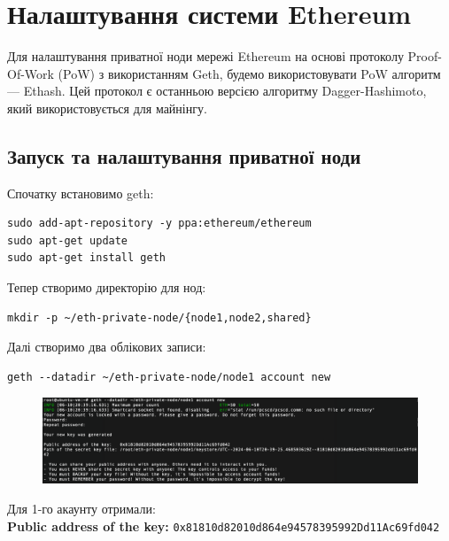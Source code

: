 
\chapter{Налаштування системи Ethereum}
\label{chap:review}  %

Для налаштування приватної ноди мережі Ethereum на основі протоколу Proof-Of-Work (PoW) з використанням Geth, будемо використовувати PoW алгоритм --- Ethash. Цей протокол є останньою версією алгоритму Dagger-Hashimoto, який використовується для майнінгу.

\section{Запуск та налаштування приватної ноди}

Спочатку встановимо geth:
\begin{verbatim}
sudo add-apt-repository -y ppa:ethereum/ethereum
sudo apt-get update
sudo apt-get install geth
\end{verbatim}

Тепер створимо директорію для нод:
\begin{verbatim}
mkdir -p ~/eth-private-node/{node1,node2,shared}
\end{verbatim}

Далі створимо два облікових записи:
\begin{verbatim}
geth --datadir ~/eth-private-node/node1 account new
\end{verbatim}

\vspace{-0.5cm}

\begin{figure}[ht]
        \centering
        \includegraphics[scale=0.35]{IMAGES/newAcc1.png}
        \label{fig_pacman}
\end{figure}

Для 1-го акаунту отримали: \\
\textbf{Public address of the key:}   \texttt{0x81810d82010d864e94578395992Dd11Ac69fd042}

